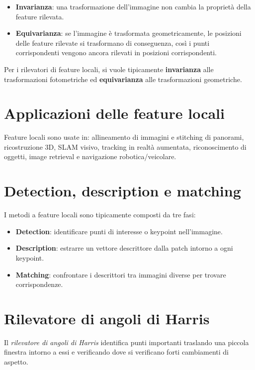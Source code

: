 \documentclass[12pt, a4paper]{report}
\begin{document}
\begin{itemize}
  \item \textbf{Invarianza}: una trasformazione dell'immagine non cambia la proprietà
        della feature rilevata.
  \item \textbf{Equivarianza}: se l'immagine è trasformata geometricamente, le
        posizioni delle feature rilevate si trasformano di conseguenza, così i punti
        corrispondenti vengono ancora rilevati in posizioni corrispondenti.
\end{itemize}

Per i rilevatori di feature locali, si vuole tipicamente \textbf{invarianza} alle
trasformazioni fotometriche ed \textbf{equivarianza} alle trasformazioni
geometriche.

\section{Applicazioni delle feature locali}

Feature locali sono usate in: allineamento di immagini e stitching di panorami,
ricostruzione 3D, SLAM visivo, tracking in realtà aumentata, riconoscimento di
oggetti, image retrieval e navigazione robotica/veicolare.

\section{Detection, description e matching}

I metodi a feature locali sono tipicamente composti da tre fasi:
\begin{itemize}
  \item \textbf{Detection}: identificare punti di interesse o keypoint nell'immagine.
  \item \textbf{Description}: estrarre un vettore descrittore dalla patch intorno a
        ogni keypoint.
  \item \textbf{Matching}: confrontare i descrittori tra immagini diverse per trovare
        corrispondenze.
\end{itemize}

\section{Rilevatore di angoli di Harris}

\begin{defbox}
Il \textit{rilevatore di angoli di Harris} identifica punti importanti traslando una
piccola finestra intorno a essi e verificando dove si verificano forti cambiamenti
di aspetto.
\end{defbox}
\end{document}
